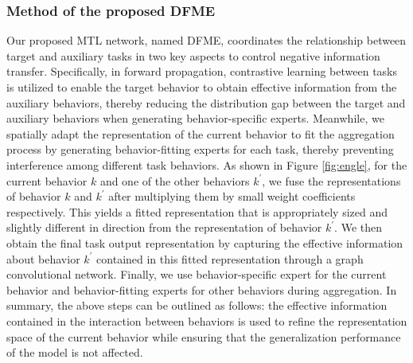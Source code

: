 \subsubsection{Method of the proposed DFME}
\label{method_dfme}
Our proposed MTL network, named DFME, coordinates the relationship between target and auxiliary tasks in two key aspects to control negative information transfer. Specifically, in forward propagation, contrastive learning between tasks is utilized to enable the target behavior to obtain effective information from the auxiliary behaviors, thereby reducing the distribution gap between the target and auxiliary behaviors when generating behavior-specific experts. Meanwhile, we spatially adapt the representation of the current behavior to fit the aggregation process by generating behavior-fitting experts for each task, thereby preventing interference among different task behaviors. As shown in Figure \ref{fig:engle}, for the current behavior $k$ and one of the other behaviors $k^{\prime}$, we fuse the representations of behavior $k$ and $k^{\prime}$ after multiplying them by small weight coefficients respectively. This yields a fitted representation that is appropriately sized and slightly different in direction from the representation of behavior $k^{\prime}$. We then obtain the final task output representation by capturing the effective information about behavior $k^{\prime}$ contained in this fitted representation through a graph convolutional network. Finally, we use behavior-specific expert for the current behavior and behavior-fitting experts for other behaviors during aggregation. In summary, the above steps can be outlined as follows: the effective information contained in the interaction between behaviors is used to refine the representation space of the current behavior while ensuring that the generalization performance of the model is not affected.

